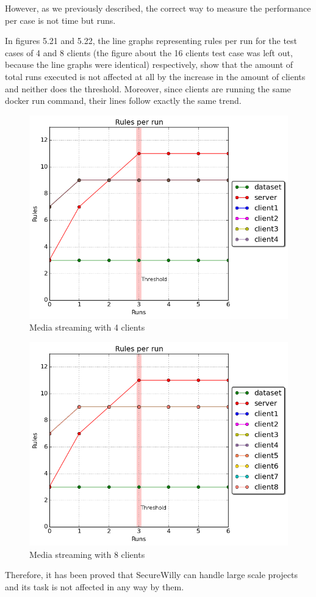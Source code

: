 However, as we previously described, the correct way to measure the performance per case is not time but runs.

In figures 5.21 and 5.22, the line graphs representing rules per run for the test cases of 4 and 8 clients (the figure about the 16 clients test case was left out, because the line graphs were identical) respectively, show that the amount of total runs executed is not affected at all by the increase in the amount of clients and neither does the threshold. Moreover, since clients are running the same docker run command, their lines follow exactly the same trend.

\begin{figure}[h!]
  \centering
   \includegraphics[width=0.65\linewidth]{../figures/scalability/rules_4_t.png}
   \caption{Media streaming with 4 clients}
\end{figure}
\hfill\break\hfill\break
\begin{figure}[h!]
  \centering
   \includegraphics[width=0.68\linewidth]{../figures/scalability/rules_8_t.png}
   \caption{Media streaming with 8 clients}
\end{figure}

Therefore, it has been proved that SecureWilly can handle large scale projects and its task is not affected in any way by them.

